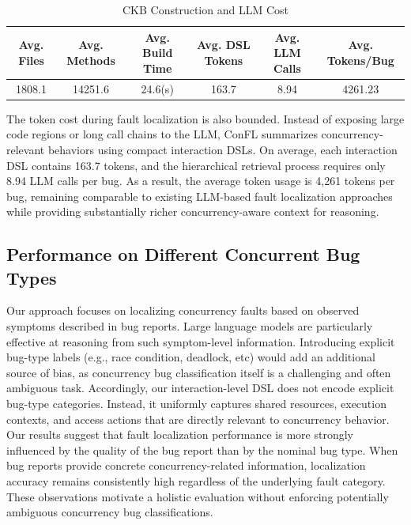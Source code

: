 \vspace{-0.5em}
\begin{table}[H] 
\centering
\caption{CKB Construction and LLM Cost}
\vspace{-8pt}
\label{tab:cost}
\scriptsize
\setlength{\tabcolsep}{5pt}

\begin{tabular}{cccccc}
\toprule
\textbf{Avg. Files} &
\textbf{Avg. Methods} &
\textbf{Avg. Build Time} &
\textbf{Avg. DSL Tokens} &
\textbf{Avg. LLM Calls} &
\textbf{Avg. Tokens/Bug} \\
\midrule
1808.1
 & 14251.6
 &  24.6(s)
 & 163.7
 & 8.94
 & 4261.23 \\
\bottomrule
\end{tabular}
\end{table}
\vspace{-0.5em}


The token cost during fault localization is also bounded. Instead of exposing large code regions or long call chains to the LLM, ConFL summarizes concurrency-relevant behaviors using compact interaction DSLs. On average, each interaction DSL contains 163.7 tokens, and the hierarchical retrieval process requires only 8.94 LLM calls per bug. As a result, the average token usage is 4,261 tokens per bug, remaining comparable to existing LLM-based fault localization approaches while providing substantially richer concurrency-aware context for reasoning.



\subsection{Performance on Different Concurrent Bug Types}
\label{sec:discussion-bugtype}

Our approach focuses on localizing concurrency faults based on observed symptoms described in bug reports.
Large language models are particularly effective at reasoning from such symptom-level information.
Introducing explicit bug-type labels (e.g., race condition, deadlock, etc) would add an additional source of bias, as concurrency bug classification itself is a challenging and often ambiguous task. 
Accordingly, our interaction-level DSL does not encode explicit bug-type categories.
Instead, it uniformly captures shared resources, execution contexts, and access actions that are directly relevant to concurrency behavior.
Our results suggest that fault localization performance is more strongly influenced by the quality of the bug report than by the nominal bug type.
When bug reports provide concrete concurrency-related information, localization accuracy remains consistently high regardless of the underlying fault category.
These observations motivate a holistic evaluation without enforcing potentially ambiguous concurrency bug classifications.

